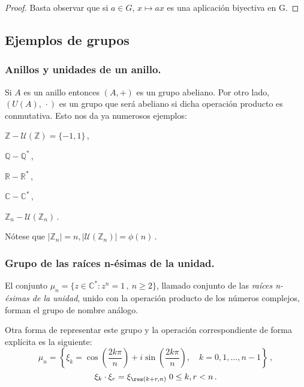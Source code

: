 \begin{proof}
  Basta observar que si $a\in G$, $x \mapsto ax$ es una aplicación biyectiva en G.
\end{proof}

\subsection{Ejemplos de grupos}

\subsubsection{Anillos y unidades de un anillo.}

Si $A$ es un anillo entonces $(A,+)$ es un grupo abeliano. Por otro lado, $(U(A),\,\cdot)$ es un grupo que será abeliano si dicha operación producto es conmutativa. Esto nos da ya numerosos ejemplos:

\begin{itemize*}[label=,itemjoin=\hspace{2em},before=\hspace{\zadlen}]
  \item $\mathbb{Z}-\mathcal U\left(\mathbb{Z}\right)=\{-1,1\}$\,,
  \item $\mathbb{Q}-\mathbb{Q}^{*}$\,,
  \item $\mathbb{R}-\mathbb{R}^{*}$\,,
  \item $\mathbb{C}-\mathbb{C}^{*}$\,,
  \item $\mathbb{Z}_n-\mathcal U\left(\mathbb{Z}_n\right)$\,.
\end{itemize*}

Nótese que $|\mathbb{Z}_n| = n,|\mathcal U\left(\mathbb{Z}_n\right)| = \phi(n)$\,.

\subsubsection{Grupo de las raíces n-ésimas de la unidad.}

El conjunto $\mu_n = \{z \in \mathbb{C}^{*} : z^n = 1\,,\ n \geq 2\}$, llamado conjunto de las \textit{raíces n-ésimas de la unidad}, unido con la operación producto de los números complejos, forman el grupo de nombre análogo.

Otra forma de representar este grupo y la operación correspondiente de forma explícita es la siguiente:
$$\mu_n = \left\{\xi_k = \cos\left(\frac{2k\pi}{n}\right)+i\sin\left(\frac{2k\pi}{n}\right),\quad k=0,1,\dots ,n-1\right\}\,,$$
$$\xi_k \cdot \xi_r = \xi_{\res(k+r,n)} \; 0 \le k,r < n\,.$$

